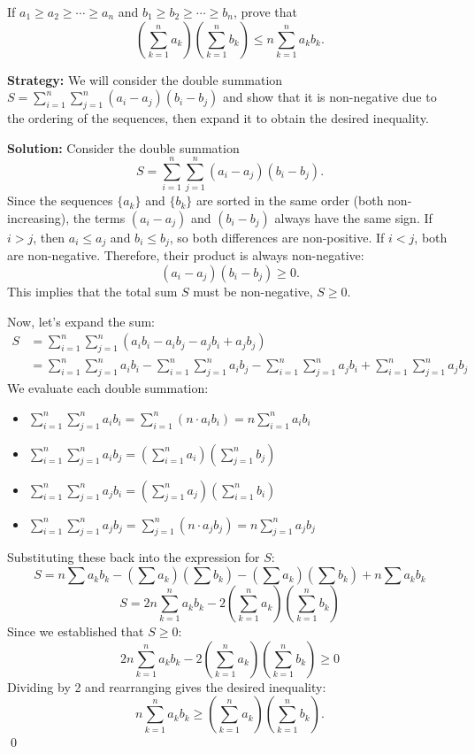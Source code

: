 \begin{problembox}
\begin{problemstatement}
If \( a_1 \geq a_2 \geq \cdots \geq a_n \) and \( b_1 \geq b_2 \geq \cdots \geq b_n \), prove that
\[
\left( \sum_{k=1}^n a_k \right)\left( \sum_{k=1}^n b_k \right) \leq n \sum_{k=1}^n a_k b_k.
\]
\end{problemstatement}
\end{problembox}

\noindent\textbf{Strategy:} We will consider the double summation $S = \sum_{i=1}^n \sum_{j=1}^n (a_i - a_j)(b_i - b_j)$ and show that it is non-negative due to the ordering of the sequences, then expand it to obtain the desired inequality.

\bigskip\noindent\textbf{Solution:}
Consider the double summation
\[ S = \sum_{i=1}^n \sum_{j=1}^n (a_i - a_j)(b_i - b_j). \]
Since the sequences $\{a_k\}$ and $\{b_k\}$ are sorted in the same order (both non-increasing), the terms $(a_i - a_j)$ and $(b_i - b_j)$ always have the same sign. If $i>j$, then $a_i \le a_j$ and $b_i \le b_j$, so both differences are non-positive. If $i<j$, both are non-negative. Therefore, their product is always non-negative:
\[ (a_i - a_j)(b_i - b_j) \geq 0. \]
This implies that the total sum $S$ must be non-negative, $S \geq 0$.

Now, let's expand the sum:
\begin{align*}
S &= \sum_{i=1}^n \sum_{j=1}^n (a_i b_i - a_i b_j - a_j b_i + a_j b_j) \\
&= \sum_{i=1}^n \sum_{j=1}^n a_i b_i - \sum_{i=1}^n \sum_{j=1}^n a_i b_j - \sum_{i=1}^n \sum_{j=1}^n a_j b_i + \sum_{i=1}^n \sum_{j=1}^n a_j b_j
\end{align*}
We evaluate each double summation:
\begin{itemize}
\item \( \sum_{i=1}^n \sum_{j=1}^n a_i b_i = \sum_{i=1}^n \left( n \cdot a_i b_i \right) = n \sum_{i=1}^n a_i b_i \)
\item \( \sum_{i=1}^n \sum_{j=1}^n a_i b_j = \left( \sum_{i=1}^n a_i \right) \left( \sum_{j=1}^n b_j \right) \)
\item \( \sum_{i=1}^n \sum_{j=1}^n a_j b_i = \left( \sum_{j=1}^n a_j \right) \left( \sum_{i=1}^n b_i \right) \)
\item \( \sum_{i=1}^n \sum_{j=1}^n a_j b_j = \sum_{j=1}^n \left( n \cdot a_j b_j \right) = n \sum_{j=1}^n a_j b_j \)
\end{itemize}
Substituting these back into the expression for $S$:
\[
S = n \sum a_k b_k - \left(\sum a_k\right)\left(\sum b_k\right) - \left(\sum a_k\right)\left(\sum b_k\right) + n \sum a_k b_k
\]
\[
S = 2n \sum_{k=1}^n a_k b_k - 2 \left( \sum_{k=1}^n a_k \right) \left( \sum_{k=1}^n b_k \right)
\]
Since we established that $S \geq 0$:
\[
2n \sum_{k=1}^n a_k b_k - 2 \left( \sum_{k=1}^n a_k \right) \left( \sum_{k=1}^n b_k \right) \geq 0
\]
Dividing by 2 and rearranging gives the desired inequality:
\[
n \sum_{k=1}^n a_k b_k \geq \left( \sum_{k=1}^n a_k \right) \left( \sum_{k=1}^n b_k \right).
\]\qed

